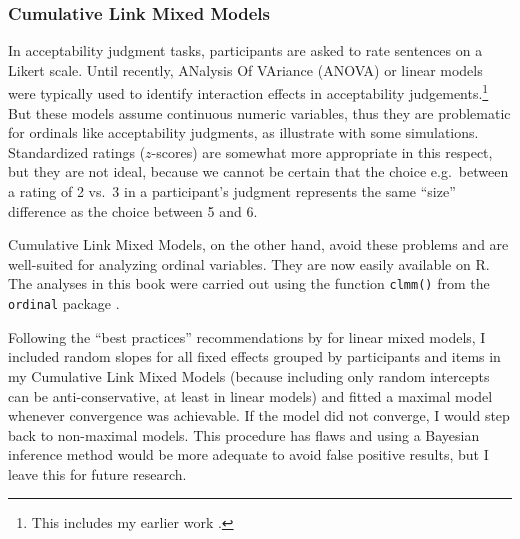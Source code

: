 \subsubsection{Cumulative Link Mixed Models}\label{ch:cumulative-link-model}
In acceptability judgment tasks, participants are asked to rate sentences on a Likert scale. 
Until recently, ANalysis Of VAriance (ANOVA) or linear models were typically used to identify interaction effects in acceptability judgements.\footnote{This includes my earlier work \citep{Abeille.2016,Abeille.2020.Cognition,Abeille.2020.JFLS}.} But these models assume continuous numeric variables, thus they are problematic for ordinals like acceptability judgments, as \citet{Dillon.2019} illustrate with some simulations. Standardized ratings ($z$-scores) are somewhat more appropriate in this respect, but they are not ideal, because we cannot be certain that the choice e.g.\ between a rating of 2 vs.\ 3 in a participant's judgment represents the same ``size'' difference as the choice between 5 and 6.

\begin{sloppypar}
Cumulative Link Mixed Models, on the other hand, avoid these problems and are well-suited for analyzing ordinal variables. 
They are now easily available on R. The analyses in this book were carried out using the function \texttt{clmm()} from the \texttt{ordinal} package \citep{clmm}.
\end{sloppypar}
\largerpage

Following the ``best practices'' recommendations by \citet[275--277]{Barr.2013} for linear mixed models, I included random slopes for all fixed effects grouped by participants and items in my Cumulative Link Mixed Models (because including only random intercepts can be anti-conservative, at least in linear models) and fitted a maximal model whenever convergence was achievable. If the model did not converge, I would step back to non-maximal models. This procedure has flaws and using a Bayesian inference method would be more adequate to avoid false positive results, but I leave this for future research.


